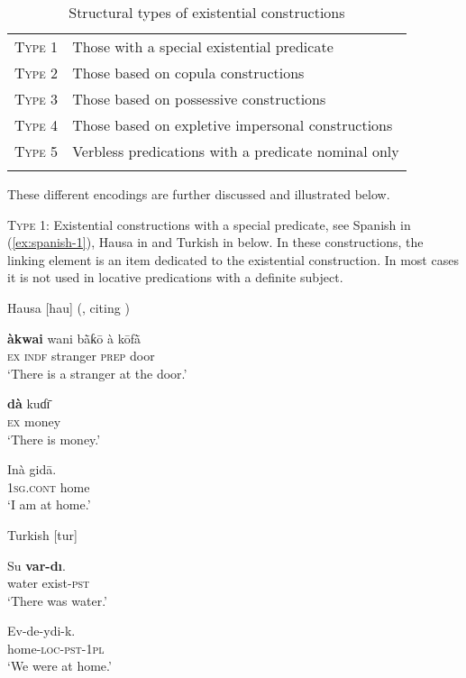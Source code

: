 \documentclass[output=paper,chinesefont,colorlinks,citecolor=brown]{langscibook}
\begin{document}
\begin{table}
\begin{tabular}{ll}
\lsptoprule
\textsc{Type 1} & Those with a special existential predicate  \\
\textsc{Type 2} & Those based on copula constructions\\
\textsc{Type 3} & Those based on possessive constructions\\
\textsc{Type 4} & Those based on expletive impersonal constructions\\
\textsc{Type 5} & Verbless predications with a predicate nominal only\\
\lspbottomrule
\end{tabular}
\caption{Structural types of existential constructions}
\label{tab:structural-types-EX-constructions}
\end{table}

These different encodings are further discussed and illustrated below.

\textsc{Type 1}:	Existential constructions with a special predicate, see Spanish in (\ref{ex:spanish-1}), Hausa in  and Turkish in  below. In these constructions, the linking element is an item dedicated to the existential construction. In most cases it is not used in locative predications with a definite subject.
\begin{exe}
\ex Hausa [hau] (, citing \citealt[178--179, 357]{Newman2000}) \label{ex:hausa-1}
\begin{xlist}
\ex \label{ex:hausa-1a}
\gll \textbf{àkwai} wani bā̀ƙō à kōfā̀ \\
  	\textsc{ex} \textsc{indf} stranger \textsc{prep} door\\
\glt `There is a stranger at the door.'

\ex \label{ex:hausa-1b}
\gll \textbf{dà} kuɗɪ̄\\
  	\textsc{ex} money\\
\glt `There is money.'

\ex \label{ex:hausa-1c}
\gll Inà gidā.\\
\textsc{1sg.cont} home\\
\glt `I am at home.'
\end{xlist}
\end{exe}

\begin{exe}
\ex \label{ex:turkish-1}Turkish [tur] \citep[44, 41]{vanschaaik1994}
\begin{xlist}
\ex \label{ex:turkish-1a}
\gll Su \textbf{var-dı}.\\
water exist-\textsc{pst}\\
\glt `There was water.'

\ex \label{ex:turkish-1b}
\gll Ev-de-ydi-k.\\
home-\textsc{loc}-\textsc{pst}-\textsc{1pl}\\
\glt `We were at home.'
\end{xlist}
\end{exe}
\end{document}
